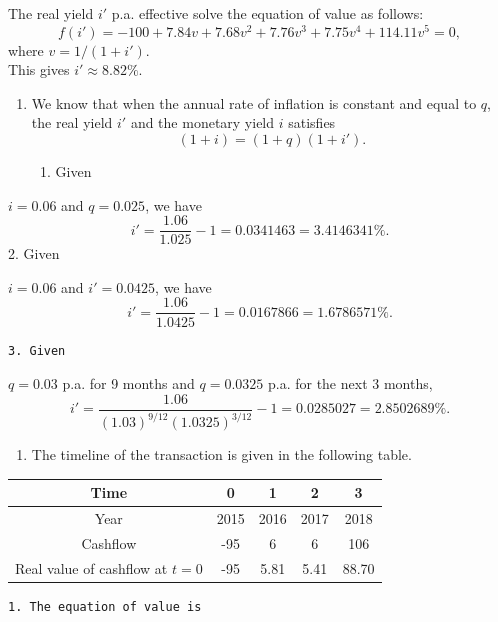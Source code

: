 \documentclass[
]{book}
\providecommand{\tightlist}{%
  \setlength{\itemsep}{0pt}\setlength{\parskip}{0pt}}
\theoremstyle{definition}
\theoremstyle{definition}
\theoremstyle{definition}
\theoremstyle{definition}
\theoremstyle{remark}
\begin{document}
The real yield \(i'\) p.a. effective solve the equation of value as
follows:
\[f(i') = -100 + 7.84 v  + 7.68v^2 + 7.76v^3 + 7.75v^4 + 114.11v^5 = 0,\]
where \(v = 1/(1 + i')\).\\
This gives \(i' \approx 8.82\%\).

\begin{enumerate}
\def\labelenumi{\arabic{enumi}.}
\setcounter{enumi}{1}
\item
  We know that when the annual rate of inflation is constant and equal to \(q\), the real yield \(i'\) and the monetary yield \(i\) satisfies \[(1 +i) = ( 1 + q)(1+i').\]

  \begin{enumerate}
  \def\labelenumii{\arabic{enumii}.}
  \tightlist
  \item
    Given
  \end{enumerate}
\end{enumerate}

\(i =0.06\) and \(q = 0.025\), we have
\[ i' = \frac{1.06}{1.025} - 1 = 0.0341463 = 3.4146341\%.\]
2. Given

\(i =0.06\) and \(i' = 0.0425\), we have
\[ i' = \frac{1.06}{1.0425} - 1 = 0.0167866 = 1.6786571\%.\]

\begin{verbatim}
3. Given 
\end{verbatim}

\(q = 0.03\) p.a. for 9 months and \(q = 0.0325\) p.a. for the next 3 months,
\[ i' = \frac{1.06}{(1.03)^{9/12}(1.0325)^{3/12}} - 1 = 0.0285027 = 2.8502689\%.\]

\begin{enumerate}
\def\labelenumi{\arabic{enumi}.}
\setcounter{enumi}{2}
\tightlist
\item
  The timeline of the transaction is given in the following table.
\end{enumerate}

\begin{longtable}[]{@{}ccccc@{}}
\toprule\noalign{}
Time & 0 & 1 & 2 & 3 \\
\midrule\noalign{}
\endhead
\bottomrule\noalign{}
\endlastfoot
Year & 2015 & 2016 & 2017 & 2018 \\
Cashflow & -95 & 6 & 6 & 106 \\
Real value of cashflow at \(t = 0\) & -95 & 5.81 & 5.41 & 88.70 \\
\end{longtable}

\begin{verbatim}
1. The equation of value is
\end{verbatim}
\end{document}
